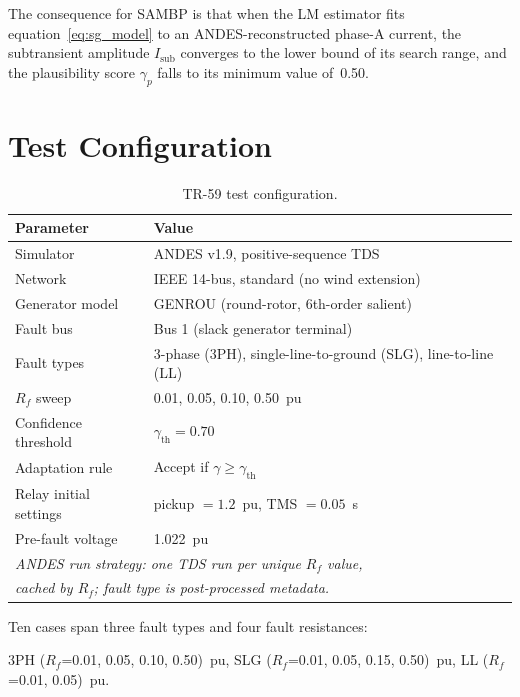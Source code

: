 \documentclass[11pt,a4paper]{article}
\newcommand{\Isub}{I_{\text{sub}}}
\newcommand{\gconf}{\gamma}
\newcommand{\gth}{\gamma_{\text{th}}}
\begin{document}
The consequence for SAMBP is that when the LM estimator fits
equation~\eqref{eq:sg_model} to an ANDES-reconstructed phase-A current, the
subtransient amplitude $\Isub$ converges to the lower bound of its search
range, and the plausibility score $\gconf_p$ falls to its minimum value of~0.50.

\section{Test Configuration}
\label{sec:config}

\begin{table}[ht]
  \centering
  \caption{TR-59 test configuration.}
  \label{tab:config}
  \begin{tabular}{ll}
    \toprule
    Parameter & Value \\
    \midrule
    Simulator       & ANDES v1.9, positive-sequence TDS \\
    Network         & IEEE 14-bus, standard (no wind extension) \\
    Generator model & GENROU (round-rotor, 6th-order salient) \\
    Fault bus       & Bus 1 (slack generator terminal) \\
    Fault types     & 3-phase (3PH), single-line-to-ground (SLG), line-to-line (LL) \\
    $R_f$ sweep     & 0.01, 0.05, 0.10, 0.50~pu \\
    Confidence threshold & $\gth = 0.70$ \\
    Adaptation rule & Accept if $\gconf \geq \gth$ \\
    Relay initial settings & pickup $= 1.2$~pu, TMS $= 0.05$~s \\
    Pre-fault voltage & 1.022~pu \\
    \midrule
    \multicolumn{2}{l}{\textit{ANDES run strategy: one TDS run per unique $R_f$ value,}} \\
    \multicolumn{2}{l}{\textit{cached by $R_f$; fault type is post-processed metadata.}} \\
    \bottomrule
  \end{tabular}
\end{table}

Ten cases span three fault types and four fault resistances:

\begin{center}
  3PH ($R_f$=0.01, 0.05, 0.10, 0.50)~pu,\quad
  SLG ($R_f$=0.01, 0.05, 0.15, 0.50)~pu,\quad
  LL ($R_f$=0.01, 0.05)~pu.
\end{center}
\end{document}
